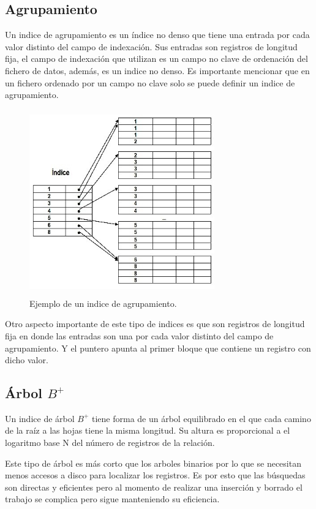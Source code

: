 \documentclass[12pt, titlepage]{article}
\begin{document}
	\subsection{Agrupamiento}
	Un indice de agrupamiento es un índice no denso que tiene una entrada por cada valor distinto del campo de indexación.
	Sus entradas son registros de longitud fija, el campo de indexación que utilizan es un campo no clave de ordenación del fichero de datos, además, es un indice no denso. Es importante mencionar que en un fichero ordenado por un campo no clave solo se puede definir un indice de agrupamiento.
	\begin{figure}[H]
		\begin{center}
			\includegraphics[width=8cm, height=8cm]{img/agrupamiento.jpg}
			\caption{Ejemplo de un indice de agrupamiento.}
			\label{fig:hasta}
		\end{center}
	\end{figure}
	Otro aspecto importante de este tipo de indices es que son registros de longitud fija en donde las entradas son una por cada valor distinto del campo de agrupamiento. Y el puntero apunta al primer bloque que contiene un registro con dicho valor.
	
	\subsection{Árbol $B^{+}$}
	Un indice de árbol $B^{+}$ tiene forma de un árbol equilibrado en el que cada camino de la raíz a las hojas tiene la misma longitud. Su altura es proporcional a el logaritmo base N del número de registros de la relación.
	
	Este tipo de árbol es más corto que los arboles binarios por lo que se necesitan menos accesos a disco para localizar los registros. Es por esto que las búsquedas son directas y eficientes pero al momento de realizar una inserción y borrado el trabajo se complica pero sigue manteniendo su eficiencia.
	
\end{document}
